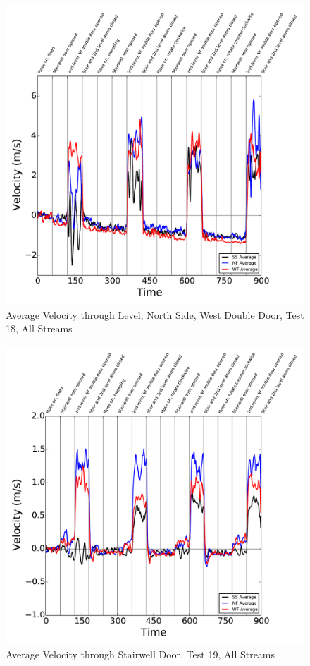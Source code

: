 \documentclass[12pt,oneside]{book}
\begin{document}
\begin{figure}[!ht]
\includegraphics[width=6in]{../../../Figures/Hose_Test_Figures/Test_18_West_063014_BDP_A13_Avg}
\caption{Average Velocity through  Level, North Side, West Double Door, Test 18, All Streams}
\label{fig:Test_18_BDP_A13_Avg_All}
\end{figure}

\clearpage

\begin{figure}[!ht]
\includegraphics[width=6in]{../../../Figures/Hose_Test_Figures/Test_19_West_063014_BDP_A10_Avg}
\caption{Average Velocity through Stairwell Door, Test 19, All Streams}
\label{fig:Test_19_BDP_A10_Avg_All}
\end{figure}
\end{document}

